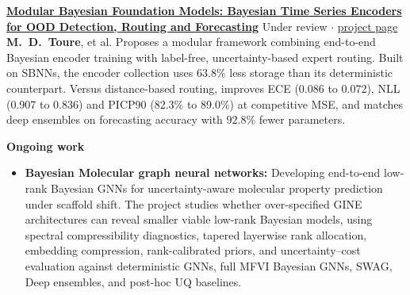 \documentclass[10pt, a4paper]{article}
\begin{document}
\begin{minipage}{\linewidth}
\noindent \textbf{\href{https://arxiv.org/abs/2610.39043}{Modular Bayesian Foundation Models: Bayesian Time Series Encoders for OOD Detection, Routing and Forecasting}} \hfill {\small \textcolor{theme}{Under review $\cdot$ \href{https://arradiat.github.io/projects/modular-bayesian-foundation-models/}{project page}}} \\
{\small {\textbf{M.\ D.\ Toure}}, et al.
Proposes a modular framework combining end-to-end Bayesian encoder training with label-free, uncertainty-based expert routing. Built on SBNNs, the encoder collection uses $63.8\%$ less storage than its deterministic counterpart. Versus distance-based routing, improves ECE (0.086 to 0.072), NLL (0.907 to 0.836) and PICP90 (82.3\% to 89.0\%) at competitive MSE, and matches deep ensembles on forecasting accuracy with $92.8\%$ fewer parameters.}
\end{minipage}
\vspace{0.1em}

\noindent \textbf{Ongoing work}\
\begin{itemize}[leftmargin=1.2em, nosep, label=\tiny$\bullet$, itemsep=1pt]
\item \textbf{Bayesian Molecular graph neural networks:} Developing end-to-end low-rank Bayesian GNNs for uncertainty-aware molecular property prediction under scaffold shift. The project studies whether over-specified GINE architectures can reveal smaller viable low-rank Bayesian models, using spectral compressibility diagnostics, tapered layerwise rank allocation, embedding compression, rank-calibrated priors, and uncertainty–cost evaluation against deterministic GNNs, full MFVI Bayesian GNNs, SWAG, Deep ensembles, and post-hoc UQ baselines.
\end{itemize}
\end{document}
